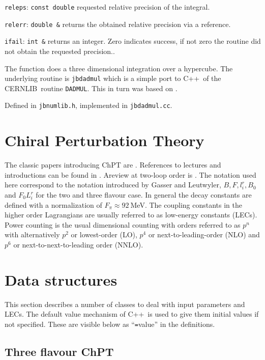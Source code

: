 \documentclass[12pt,a4paper]{article}
\newcommand{\mytt}[1]{\texttt{#1}}
\newcommand{\cernlib}{\textsc{CERNLIB}\cite{cernlib}}
\newcommand{\cpp}{\textsc{C++}}
\begin{document}
\mytt{releps}: \mytt{const double} requested relative precision of the integral.

\mytt{relerr}: \mytt{double \&} returns the obtained relative precision
via a reference.

\mytt{ifail}: \mytt{int \&} returns an integer. Zero indicates success,
if not zero the routine did not obtain the requested precision..

The function does a three dimensional integration over a hypercube.
The underlying routine is \mytt{jbdadmul} which is
a simple port to \cpp\ of the \cernlib\ routine
 \mytt{DADMUL}. This in turn was based on \cite{radmulpaper}.

Defined in \mytt{jbnumlib.h}, implemented in \mytt{jbdadmul.cc}.

\section{Chiral Perturbation Theory}

The classic papers introducing ChPT are
\cite{Weinberg:1978kz,Gasser:1983yg,Gasser:1984gg}.
References to lectures and introductions can be found in \cite{webpage}.
Areview at two-loop order is \cite{Bijnens:2006zp}.
The notation used here correspond to the notation introduced by Gasser
and Leutwyler, $B,F,l_i^r,B_0$ \cite{Gasser:1983yg} and
$F_0L_i^r$ \cite{Gasser:1984gg} for the two and three flavour case.
In general the decay constants are defined with a normalization of
$F_\pi\approx 92~$MeV. The coupling constants in the higher order Lagrangians
are usually referred to as low-energy constants (LECs). Power counting
is the usual dimensional counting with orders referred to as $p^n$
with alternatively $p^2$ or lowest-order (LO), $p^4$ or next-to-leading-order
(NLO) and $p^6$ or next-to-next-to-leading order (NNLO).

\section{Data structures}

This section describes a number of classes to deal with input parameters
and LECs. The default value mechanism of \cpp\ is used to give them
initial values if not specified. These are visible below as ``\mytt=value''
in the definitions.

\subsection{Three flavour ChPT}
\end{document}
